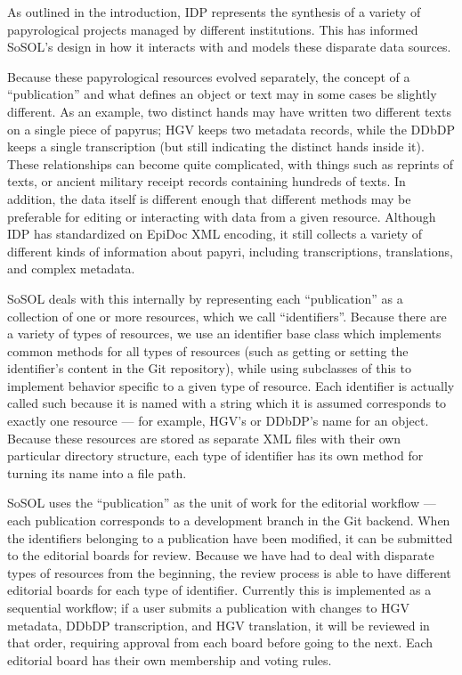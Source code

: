 \documentclass[]{article}
\begin{document}
As outlined in the introduction, IDP represents the synthesis of a variety of papyrological projects managed by different institutions. This has informed SoSOL's design in how it interacts with and models these disparate data sources.

Because these papyrological resources evolved separately, the concept of a “publication” and what defines an object or text may in some cases be slightly different. As an example, two distinct hands may have written two different texts on a single piece of papyrus; HGV keeps two metadata records, while the DDbDP keeps a single transcription (but still indicating the distinct hands inside it). These relationships can become quite complicated, with things such as reprints of texts, or ancient military receipt records containing hundreds of texts. In addition, the data itself is different enough that different methods may be preferable for editing or interacting with data from a given resource. Although IDP has standardized on EpiDoc XML encoding, it still collects a variety of different kinds of information about papyri, including transcriptions, translations, and complex metadata.

SoSOL deals with this internally by representing each “publication” as a collection of one or more resources, which we call “identifiers”. Because there are a variety of types of resources, we use an identifier base class which implements common methods for all types of resources (such as getting or setting the identifier's content in the Git repository), while using subclasses of this to implement behavior specific to a given type of resource. Each identifier is actually called such because it is named with a string which it is assumed corresponds to exactly one resource — for example, HGV's or DDbDP's name for an object. Because these resources are stored as separate XML files with their own particular directory structure, each type of identifier has its own method for turning its name into a file path.

SoSOL uses the “publication” as the unit of work for the editorial workflow  — each publication corresponds to a development branch in the Git backend. When the identifiers belonging to a publication have been modified, it can be submitted to the editorial boards for review. Because we have had to deal with disparate types of resources from the beginning, the review process is able to have different editorial boards for each type of identifier. Currently this is implemented as a sequential workflow; if a user submits a publication with changes to HGV metadata, DDbDP transcription, and HGV translation, it will be reviewed in that order, requiring approval from each board before going to the next. Each editorial board has their own membership and voting rules.
\end{document}
